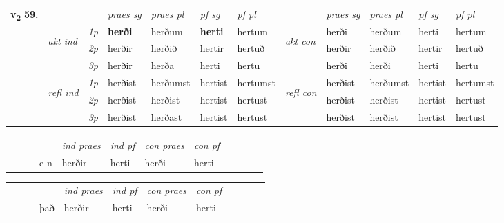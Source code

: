 \begin{tabular}{llllllllllll} \toprule
\multirow{4}{*}{{{\textbf{v{\textsubscript{2}}} \Large{\textbf{59.}}}}}  & &   &  \textit{praes sg}  & \textit{praes pl}  &\textit{ pf sg} & \textit{pf pl} &  &  \textit{praes sg}  & \textit{praes pl}  & \textit{pf sg} & \textit{pf pl } \\*
	\cmidrule{4-7} \cmidrule{9-12}
 & \multirow{3}{*}{\begin{turn}{90}\textit{akt ind}\end{turn}} & {\textit{1p}} & \textbf{herði} & herðum    & \textbf{herti} & hertum & \multirow{3}{*}{\begin{turn}{90}\textit{akt con}\end{turn}} &herði & herðum & herti & hertum\\*
& &  {\textit{2p}} &  herðir  & herðið   & hertir & hertuð & & herðir & herðið & hertir & hertuð \\*
& &  {\textit{3p}} & herðir & herða   & herti & hertu & & herði & herði& herti & hertu  \\*
\cmidrule{4-7} \cmidrule{9-12}
 &\multirow{3}{*}{\begin{turn}{90}\textit{refl ind}\end{turn}} & {\textit{1p}} & herðist & herðumst    & hertist & hertumst & \multirow{3}{*}{\begin{turn}{90}\textit{refl con}\end{turn}}  &herðist & herðumst & hertist & hertumst\\*
 &&  {\textit{2p}} &  herðist  & herðist   & hertist & hertust & &herðist & herðist & hertist & hertust \\*
& &  {\textit{3p}} & herðist & herðast   & hertist & hertust & & herðist & herðist& hertist & hertust  \\*
\cmidrule{4-7} \cmidrule{9-12}
\end{tabular}


\begin{tabular}{llllllllllll}
 & &  & &  \textit{ind praes} & \textit{ind pf} & \textit{con praes} & \textit{con pf} \\*
&  & & e-n & herðir & herti & herði & herti \\*
\cmidrule{5-9}
\end{tabular}


\begin{tabular}{llllllllllll}
 & &  & &  \textit{ind praes} & \textit{ind pf} & \textit{con praes} & \textit{con pf} \\*
&  & & það & herðir & herti & herði & herti \\*
\cmidrule{5-9}
\end{tabular}


